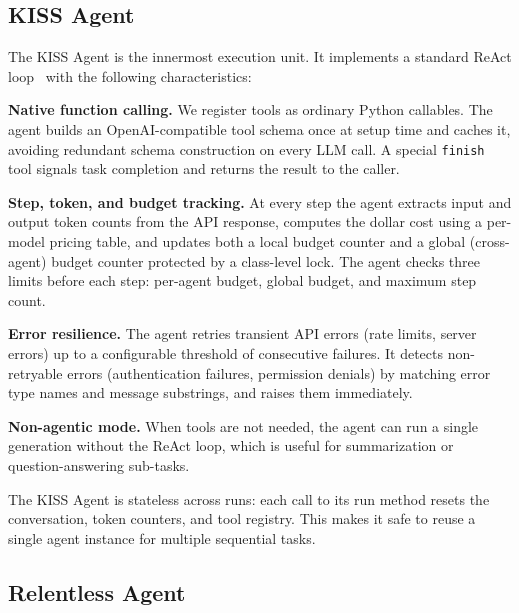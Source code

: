 \documentclass{article}
\begin{document}
\subsection{KISS Agent}
\label{sec:kiss-agent}

The KISS Agent is the innermost execution unit.  It implements a
standard ReAct loop~\citep{yao2023react} with the following
characteristics:

\textbf{Native function calling.}  We register tools as ordinary
Python callables.  The agent builds an OpenAI-compatible tool schema
once at setup time and caches it, avoiding redundant schema
construction on every LLM call.  A special \texttt{finish} tool
signals task completion and returns the result to the caller.

\textbf{Step, token, and budget tracking.}  At every step the agent
extracts input and output token counts from the API response, computes
the dollar cost using a per-model pricing table, and updates both a
local budget counter and a global (cross-agent) budget counter
protected by a class-level lock.  The agent checks three limits before
each step: per-agent budget, global budget, and maximum step count.

\textbf{Error resilience.}  The agent retries transient API errors
(rate limits, server errors) up to a configurable threshold of
consecutive failures.  It detects non-retryable errors (authentication
failures, permission denials) by matching error type names and message
substrings, and raises them immediately.

\textbf{Non-agentic mode.}  When tools are not needed, the agent can
run a single generation without the ReAct loop, which is useful for
summarization or question-answering sub-tasks.

The KISS Agent is stateless across runs: each call to its run method
resets the conversation, token counters, and tool registry.  This
makes it safe to reuse a single agent instance for multiple sequential
tasks.

\subsection{Relentless Agent}
\label{sec:relentless-agent}
\end{document}
